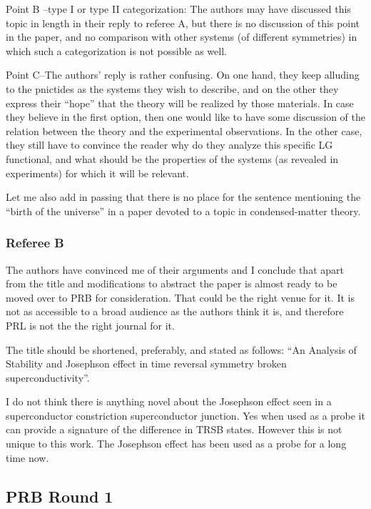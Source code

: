 \documentclass[11pt]{article}
\begin{document}
Point B --type I or type II categorization: The authors may have
discussed this topic in length in their reply to referee A, but there is
no discussion of this point in the paper, and no comparison with other
systems (of different symmetries) in which such a categorization is not
possible as well.

Point C--The authors' reply is rather confusing. On one hand, they keep
alluding to the pnictides as the systems they wish to describe, and on
the other they express their ``hope'' that the theory will be realized
by those materials. In case they believe in the first option, then one
would like to have some discussion of the relation between the theory
and the experimental observations. In the other case, they still have to
convince the reader why do they analyze this specific LG functional, and
what should be the properties of the systems (as revealed in
experiments) for which it will be relevant.

Let me also add in passing that there is no place for the sentence
mentioning the ``birth of the universe'' in a paper devoted to a topic
in condensed-matter theory.

\hypertarget{referee-b}{%
\subsubsection{Referee B}\label{referee-b}}

The authors have convinced me of their arguments and I conclude that
apart from the title and modifications to abstract the paper is almost
ready to be moved over to PRB for consideration. That could be the right
venue for it. It is not as accessible to a broad audience as the authors
think it is, and therefore PRL is not the the right journal for it.

The title should be shortened, preferably, and stated as follows: ``An
Analysis of Stability and Josephson effect in time reversal symmetry
broken superconductivity''.

I do not think there is anything novel about the Josephson effect seen
in a superconductor constriction superconductor junction. Yes when used
as a probe it can provide a signature of the difference in TRSB states.
However this is not unique to this work. The Josephson effect has been
used as a probe for a long time now.

\hypertarget{prb-round-1}{%
\subsection{PRB Round 1}\label{prb-round-1}}
\end{document}
